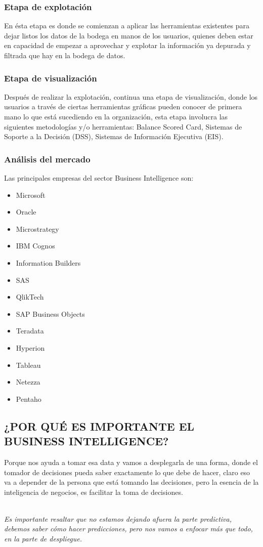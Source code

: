 \documentclass[twoside,twocolumn]{article}
\begin{document}
\subsubsection{Etapa de explotación}
En ésta etapa es donde se comienzan a aplicar las herramientas existentes para dejar listos los datos de la bodega en manos de los usuarios, quienes deben estar en capacidad de empezar a aprovechar y explotar la información ya depurada y filtrada que hay en la bodega de datos. 
\subsubsection{Etapa de visualización}
Después de realizar la explotación, continua una etapa de visualización, donde los usuarios a través de ciertas herramientas gráficas pueden conocer de primera mano lo que está sucediendo en la organización, esta etapa involucra las siguientes metodologías y/o herramientas: Balance Scored Card, Sistemas de Soporte a la Decisión (DSS), Sistemas de Información Ejecutiva (EIS).
\subsubsection{Análisis del mercado}
Las principales empresas del sector Business Intelligence son:
\begin{itemize}
    \item Microsoft 
    \item Oracle 
    \item Microstrategy 
    \item IBM Cognos 
    \item Information Builders 
    \item SAS 
    \item QlikTech 
    \item SAP Business Objects 
    \item Teradata 
    \item Hyperion 
    \item Tableau 
    \item Netezza 
    \item Pentaho
\end{itemize}

\subsection{¿POR QUÉ ES IMPORTANTE EL BUSINESS INTELLIGENCE?}
Porque nos ayuda a tomar esa data y vamos a desplegarla de una forma, donde el tomador de decisiones pueda saber exactamente lo que debe de hacer, claro eso va a depender de la persona que está tomando las decisiones, pero la esencia de la inteligencia de negocios, es facilitar la toma de decisiones.\\ \\
\begin{center}
    \textit{Es importante resaltar que no estamos dejando afuera la parte predictiva, debemos saber cómo hacer predicciones, pero nos vamos a enfocar más que todo, en la parte de despliegue.}
\end{center}
\end{document}
